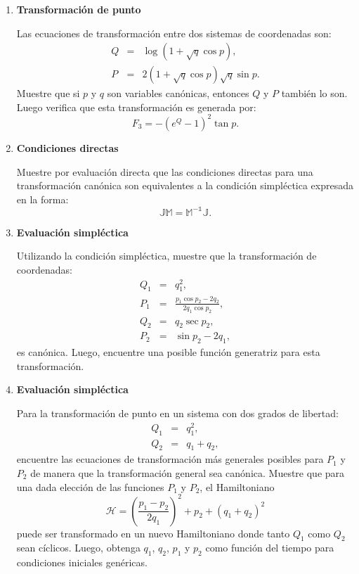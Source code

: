 \documentclass[a4paper,12pt]{article}
\begin{document}
\begin{enumerate}
  \item {\bf{Transformación de punto}}

    Las ecuaciones de transformación entre dos sistemas de coordenadas son: 
    \begin{eqnarray*}
      Q &=& \log \left ( 1 + \sqrt{q} \cos p \right ),\\
      P &=& 2 \left ( 1 + \sqrt{q} \cos p \right ) \sqrt{q} \sin p.
    \end{eqnarray*}
    Muestre que si $p$ y $q$ son variables canónicas, entonces $Q$ y $P$
    también lo son. Luego verifica que esta transformación es generada por:
    \[ F_3 = - \left ( e^Q -1 \right )^2 \tan p.\]

  \item {\bf{Condiciones directas}}

    Muestre por evaluación directa que las condiciones directas para una
    transformación canónica son equivalentes a la condición simpléctica
    expresada en la forma: 
    \[ \mathbb{J M} = \mathbb{M^{-1} J}.\]

  \item {\bf{Evaluación simpléctica}}

    Utilizando la condición simpléctica, muestre que la transformación de
    coordenadas: 
    \begin{eqnarray*}
      Q_1 &=& q_1^2, \\
      P_1 &=& \frac{p_1 \cos p_2 - 2 q_2}{2 q_1 \cos p_2}, \\
      Q_2 &=& q_2 \sec p_2, \\
      P_2 &=& \sin p_2 - 2 q_1,
    \end{eqnarray*}
    es canónica. Luego, encuentre una posible función generatriz para esta
    transformación.

  \item {\bf{Evaluación simpléctica}}

    Para la transformación de punto en un sistema con dos grados de libertad:
    \begin{eqnarray*}
      Q_1 &=& q_1^2,\\
      Q_2 &=& q_1 + q_2,
    \end{eqnarray*}
    encuentre las ecuaciones de transformación más generales posibles para
    $P_1$ y $P_2$ de manera que la transformación general sea canónica. Muestre
    que para una dada elección de las funciones $P_1$ y $P_2$, el Hamiltoniano
    \[ 
      \mathcal{H} = \left ( \frac{p_1 - p_2}{2 q_1} \right )^2 + p_2 + (q_1 +
      q_2)^2
    \]
    puede ser transformado en un nuevo Hamiltoniano donde tanto $Q_1$ como
    $Q_2$ sean cíclicos. Luego, obtenga $q_1$, $q_2$, $p_1$ y $p_2$ como
    función del tiempo para condiciones iniciales genéricas.


\end{enumerate}
\end{document}
